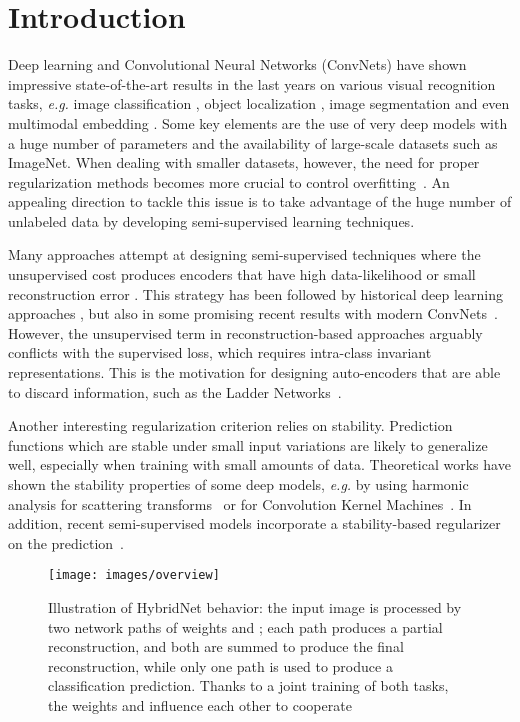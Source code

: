\documentclass[runningheads]{llncs}
\begin{document}
\section{Introduction}

Deep learning and Convolutional Neural Networks (ConvNets) have shown impressive state-of-the-art results in the last years on various visual recognition tasks, \textit{e.g.} image classification \cite{krizhevsky2012imagenet,he2016deep,Durand_WILDCAT_CVPR_2017}, object localization \cite{dai2016r,redmon2016you,Mordan2017}, image segmentation \cite{deeplab} and even multimodal embedding \cite{Martin2018,Carvalho2018,benyounescadene2017mutan}. Some key elements are the use of very deep models with a huge number of parameters and the availability of large-scale datasets such as ImageNet. When dealing with smaller datasets, however, the need for proper regularization methods becomes more crucial to control overfitting~\cite{weightdecay,batchnorm,dropout,Blot2018}. An appealing direction to tackle this issue is to take advantage of the huge number of unlabeled data by developing semi-supervised learning techniques.

Many approaches attempt at designing semi-supervised techniques where the unsupervised cost produces encoders that have high data-likelihood or small reconstruction error \cite{bengio2007greedy}. This strategy has been followed by historical deep learning approaches \cite{hinton2006reducing}, but also in some promising recent results with modern Conv\-Nets~\cite{Zhao2016a,Zhang2016a}. However, the unsupervised term in reconstruction-based approaches arguably conflicts with the supervised loss, which requires intra-class invariant representations. This is the motivation for designing auto-encoders that are able to discard information, such as the Ladder Networks~\cite{Rasmus2015}.

Another interesting regularization criterion relies on stability. Prediction functions which are stable under small input variations are likely to generalize well, especially when training with small amounts of data. Theoretical works have shown the stability properties of some deep models, \textit{e.g.} by using harmonic analysis for scattering transforms~\cite{Mallat2011,Bruna:2013:ISC:2498740.2498892} or for Convolution Kernel Machines~\cite{BiettiNIPS17}. In addition, recent semi-supervised models incorporate a stability-based regularizer on the prediction~\cite{Sajjadi2016,Laine2016,Tarvainen2017}.

\begin{figure}[tb]
	\centering
	\texttt{[image: images/overview]}
    \caption{Illustration of HybridNet behavior: the input image is processed by two network paths of weights  and ; each path produces a partial reconstruction, and both are summed to produce the final reconstruction, while only one path is used to produce a classification prediction. Thanks to a joint training of both tasks, the weights  and  influence each other to cooperate}
    \label{fig:intro}
\end{figure}
\end{document}
